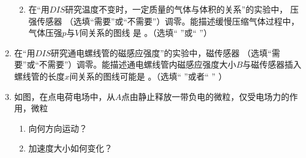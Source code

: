 \begin{enumerate}
\begin{enumerate}

\item 
在“用$ DIS $研究温度不变时，一定质量的气体与体积的关系”的实验中，
压强传感器 \underlinegap （选填“需要”或“不需要”）调零。能描述缓慢压缩气体过程中，气体压强$ p $与$ V $间关系的图线
是 \underlinegap 。（选填“  ”或“  ”）
\begin{figure}[h!]
\centering
\begin{subfigure}{0.4\linewidth}
\centering
 
\caption{}\label{2020上海36a}
\end{subfigure}
\begin{subfigure}{0.4\linewidth}
\centering
 
\caption{}\label{2020上海36b}
\end{subfigure}
\end{figure}
\end{enumerate}






\item 
在“用$ DIS $研究通电螺线管的磁感应强度”的实验中，磁传感器 \underlinegap （选填“需要”或“不需要”）调零。能描述通电螺线管内磁感应强度大小$ B $与磁传感器插入螺线管的长度$ x $间关系的图线可能是 \underlinegap 。（选填“  ”或者“  ”
）
\begin{figure}[h!]
\centering
\begin{subfigure}{0.4\linewidth}
\centering
 
\caption{}\label{2020上海37a}
\end{subfigure}
\begin{subfigure}{0.4\linewidth}
\centering
 
\caption{}\label{2020上海37b}
\end{subfigure}
\end{figure}






\newpage


\gaokaojs




\item 
如图，在点电荷电场中，从$ A $点由静止释放一带负电的微粒，仅受电场力的作用，微粒
\begin{enumerate}
\item
向何方向运动？
\item 
加速度大小如何变化？
\end{enumerate}
\begin{figure}[h!]
\flushright 

\end{figure}


\end{enumerate}
